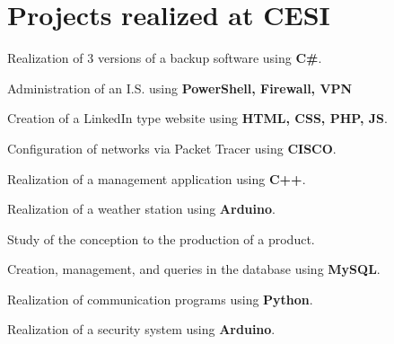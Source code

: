 \documentclass[a4paper,table]{twentysecondcv}
\begin{document}
\section{Projects realized at CESI}

\vspace{-0.2cm}
\begin{twenty}

{}
{Realization of 3 versions of a backup software using \textbf{C#}.}

{}
{Administration of an I.S. using \textbf{PowerShell, Firewall, VPN}}

{}
{Creation of a LinkedIn type website using \textbf{HTML, CSS, PHP, JS}.}

{}
{Configuration of networks via Packet Tracer using \textbf{CISCO}.}

{}
{Realization of a management application using \textbf{C++}.}

{}
{Realization of a weather station using \textbf{Arduino}.}

{}
{Study of the conception to the production of a product.}

{}
{Creation, management, and queries in the database using \textbf{MySQL}.}

{}
{Realization of communication programs using \textbf{Python}.}

{}
{Realization of a security system using \textbf{Arduino}.}

\end{twenty}
\end{document}
